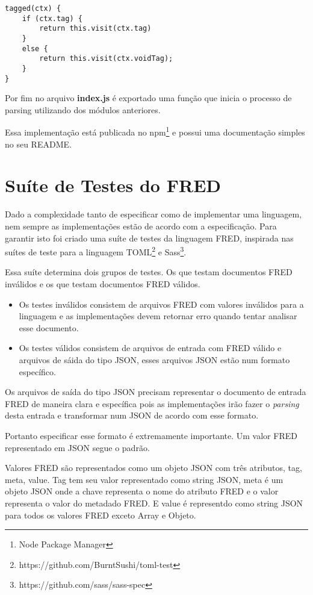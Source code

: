 \begin{lstlisting}[caption=Exemplo de ação semântica,label={lst:semanticjs}]
tagged(ctx) {
    if (ctx.tag) {
        return this.visit(ctx.tag)
    }
    else {
        return this.visit(ctx.voidTag);
    }
}
\end{lstlisting}

Por fim no arquivo \textbf{index.js} é exportado uma função que inicia o processo de 
parsing utilizando dos módulos anteriores.

Essa implementação está publicada no npm\footnote{Node Package Manager} e possui uma
documentação simples no seu README.

\section{Suíte de Testes do FRED}

Dado a complexidade tanto de especificar como de implementar uma linguagem, nem sempre 
as implementações estão de acordo com a especificação. Para garantir isto foi criado
uma suíte de testes da linguagem FRED, inspirada nas suítes de teste
para a linguagem TOML\footnote{https://github.com/BurntSushi/toml-test} 
e Sass\footnote{https://github.com/sass/sass-spec}.

Essa suíte determina dois grupos de testes. Os que testam documentos FRED inválidos
e os que testam documentos FRED válidos.

\begin{itemize}
    \item Os testes inválidos consistem de arquivos FRED com valores inválidos para a linguagem
    e as implementações devem retornar erro quando tentar analisar esse documento.
    \item Os testes válidos consistem de arquivos de entrada com FRED válido e arquivos
    de sáida do tipo JSON, esses arquivos JSON estão num formato específico. 
\end{itemize}

Os arquivos de saída do tipo JSON precisam representar o documento de entrada FRED de maneira
clara e específica pois as implementações irão fazer o \textit{parsing} desta entrada e transformar
num JSON de acordo com esse formato.

Portanto especificar esse formato é extremamente importante. Um valor FRED
representado em JSON segue o padrão.

Valores FRED são representados como um objeto JSON com três atributos, tag, meta, value.
Tag tem seu valor representado como string JSON, meta é um objeto JSON onde a chave 
representa o nome do atributo FRED e o valor representa o valor do metadado FRED.
E value é representdo como string JSON para todos os valores FRED exceto Array e Objeto.

